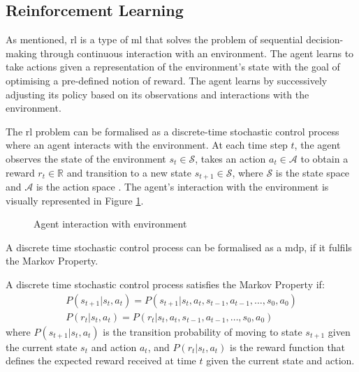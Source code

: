 \subsection{Reinforcement Learning} \label{sec:reinforcementlearning}

As mentioned, \acrshort{rl} is a type of \acrshort{ml} that solves the problem of sequential decision-making through continuous interaction with an environment. The agent learns to take actions given a representation of the environment's state with the goal of optimising a pre-defined notion of reward. The agent learns by successively adjusting its policy based on its observations and interactions with the environment. 

The \acrshort{rl} problem can be formalised as a discrete-time stochastic control process where an agent interacts with the environment. At each time step $t$, the agent observes the state of the environment $s_t \in \mathcal{S}$, takes an action $a_t \in \mathcal{A}$ to obtain a reward $r_t \in \mathbb{R}$ and transition to a new state $s_{t+1} \in \mathcal{S}$, where $\mathcal{S}$ is the state space and $\mathcal{A}$ is the action space \cite{Francois-Lavet2018}. The agent's interaction with the environment is visually represented in Figure \ref{fig:agent_environment_interaction}.

\begin{figure}[ht]
    \label{fig:agent_environment_interaction}
    \centering
    
    \caption{Agent interaction with environment}
\end{figure}

A discrete time stochastic control process can be formalised as a \acrfull{mdp}, if it fulfils the Markov Property. 

\begin{definition}
    A discrete time stochastic control process satisfies the Markov Property if:
    \begin{eqnarray}
        P(s_{t+1} | s_t, a_t) = P(s_{t+1} | s_t, a_t, s_{t-1}, a_{t-1}, \dots, s_0, a_0) \\  
        P(r_t | s_t, a_t) = P(r_t | s_t, a_t, s_{t-1}, a_{t-1}, \dots, s_0, a_0)
    \end{eqnarray}
    where $P(s_{t+1} | s_t, a_t)$ is the transition probability of moving to state $s_{t+1}$ given the current state $s_t$ and action $a_t$, and $P(r_t | s_t, a_t)$ is the reward function that defines the expected reward received at time $t$ given the current state and action.
\end{definition}


